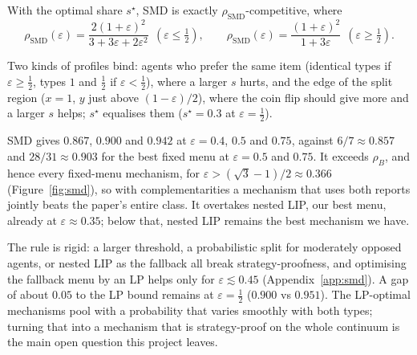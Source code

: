 \begin{proposition}\label{prop:smd_ratio}
With the optimal share $s^\star$, SMD is exactly $\rho_{\mathrm{SMD}}$-competitive, where
\[
\rho_{\mathrm{SMD}}(\varepsilon)=\frac{2(1+\varepsilon)^2}{3+3\varepsilon+2\varepsilon^2}\ \ (\varepsilon\le\tfrac12),
\qquad
\rho_{\mathrm{SMD}}(\varepsilon)=\frac{(1+\varepsilon)^2}{1+3\varepsilon}\ \ (\varepsilon\ge\tfrac12).
\]
\end{proposition}
\noindent Two kinds of profiles bind: agents who prefer the same item (identical types if
$\varepsilon\ge\tfrac12$, types $1$ and $\tfrac12$ if $\varepsilon<\tfrac12$), where a larger $s$ hurts, and the
edge of the split region ($x=1$, $y$ just above $(1-\varepsilon)/2$), where the coin flip should give
more and a larger $s$ helps; $s^\star$ equalises them ($s^\star=0.3$ at $\varepsilon=\tfrac12$).

SMD gives $0.867$, $0.900$ and $0.942$ at $\varepsilon=0.4$, $0.5$ and $0.75$, against $6/7\approx0.857$
and $28/31\approx0.903$ for the best fixed menu at $\varepsilon=0.5$ and $0.75$. It exceeds
$\rho_B$, and hence every fixed-menu mechanism, for $\varepsilon>(\sqrt3-1)/2\approx0.366$
(Figure~\ref{fig:smd}), so with complementarities a mechanism that uses both reports jointly
beats the paper's entire class. It overtakes nested LIP, our best menu, already at
$\varepsilon\approx0.35$; below that, nested LIP remains the best mechanism we have.

The rule is rigid: a larger threshold, a probabilistic split for moderately opposed agents,
or nested LIP as the fallback all break strategy-proofness, and optimising the fallback menu by
an LP helps only for $\varepsilon\lesssim0.45$ (Appendix~\ref{app:smd}). A gap of about $0.05$ to the
LP bound remains at $\varepsilon=\tfrac12$ ($0.900$ vs $0.951$). The LP-optimal mechanisms pool with a
probability that varies smoothly with both types; turning that into a mechanism that is
strategy-proof on the whole continuum is the main open question this project leaves.

